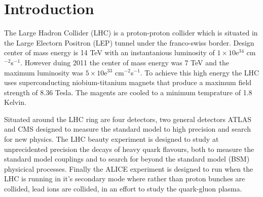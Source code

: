 \chapter{Introduction} %
\label{cha:introduction}
The Large Hadron Collider (LHC) \cite{Benedikt:823808} is a proton-proton collider which is situated in the Large Electorn Positron (LEP) tunnel under the
franco-swiss border. Design center of mass energy is 14 TeV with an instantanious luminosity of $ 1 \times 10$e$^{34}$
cm$^{-2}$s$^{-1}$. However duing 2011 the center of mass energy was 7 TeV and the maximum luminosity was $ 5 \times 10$e$^{33}$
cm$^{-2}$s$^{-1}$.
To achieve this high energy the LHC uses superconducting niobium-titanium magnets that produce a maximum field strength of 8.36
Tesla. The magents are cooled to a minimum temprature of 1.8 Kelvin.

Situated around the LHC ring are four detectors, two general detectors ATLAS \cite{Akesson:1999uv} and CMS
\cite{Friedl:1140134}\cite{Wulz:vf} designed to measure the standard model to high precision and search for new physics. The LHC beauty
experiment \cite{Rademacker:2005tx} is designed to study at unprecidented precision the decays of heavy quark flavours, both to
measure the standard model couplings and to search for beyond the standard model (BSM) physicical processes. Finally the ALICE \cite{Alessandro:2006ht}
experiment is designed to run when the LHC is running in it's secondary mode where rather than proton bunches are collided, lead
ions are collided, in an effort to study the quark-gluon plasma.
